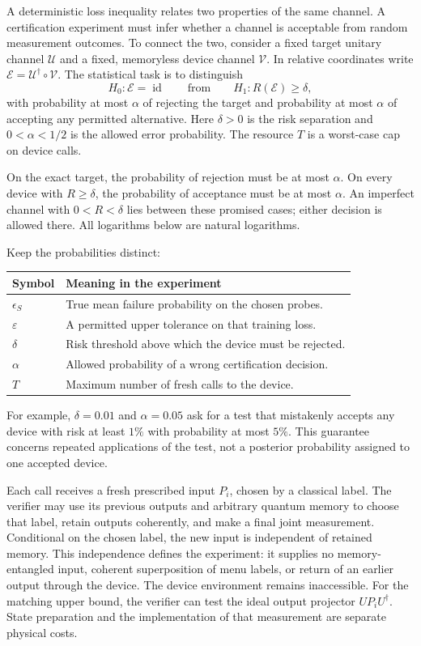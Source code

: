 \documentclass[11pt,a4paper]{article}
\newcommand{\id}{\operatorname{id}}
\numberwithin{equation}{section}
\begin{document}
A deterministic loss inequality relates two properties of the same channel.
A certification experiment must infer whether a channel is acceptable from
random measurement outcomes.  To connect the two, consider a fixed target
unitary channel $\mathcal U$ and a fixed, memoryless device channel
$\mathcal V$.  In relative coordinates write
$\mathcal E=\mathcal U^\dagger\circ\mathcal V$.  The statistical task is
to distinguish
\[
 H_0:\mathcal E=\id
 \qquad\text{from}\qquad
 H_1:R(\mathcal E)\geq\delta,
\]
with probability at most $\alpha$ of rejecting the target and probability
at most $\alpha$ of accepting any permitted alternative.  Here
$\delta>0$ is the risk separation and $0<\alpha<1/2$ is the allowed error
probability.  The resource $T$ is a worst-case cap on device calls.

On the exact target, the probability of rejection must be at most $\alpha$. On every device with $R\ge\delta$, the probability of acceptance must be at most $\alpha$. An imperfect channel with
$0<R<\delta$ lies between these promised cases; either decision is allowed
there.
All logarithms below are natural logarithms.

Keep the probabilities distinct:
\begin{center}
\begin{tabular}{@{}p{}p{}@{}}
\toprule
Symbol & Meaning in the experiment \\
\midrule
$\epsilon_S$ & True mean failure probability on the chosen probes. \\
$\varepsilon$ & A permitted upper tolerance on that training loss. \\
$\delta$ & Risk threshold above which the device must be rejected. \\
$\alpha$ & Allowed probability of a wrong certification decision. \\
$T$ & Maximum number of fresh calls to the device. \\
\bottomrule
\end{tabular}
\end{center}
For example, $\delta=0.01$ and $\alpha=0.05$ ask for a test that mistakenly
accepts any device with risk at least $1\%$ with probability at most $5\%$.
This guarantee concerns repeated applications of the test, not a posterior
probability assigned to one accepted device.

Each call receives a fresh prescribed input $P_i$, chosen by a classical
label.  The verifier may use its previous outputs and arbitrary quantum
memory to choose that label, retain outputs coherently, and make a final
joint measurement.  Conditional on the chosen label, the new input is
independent of retained memory.  This independence defines the experiment:
it supplies no memory-entangled input, coherent superposition of menu labels,
or return of an earlier output through the device.  The device environment
remains inaccessible.  For the matching upper bound, the verifier can test
the ideal output projector $UP_iU^\dagger$.  State preparation and the
implementation of that measurement are separate physical costs.
\end{document}
